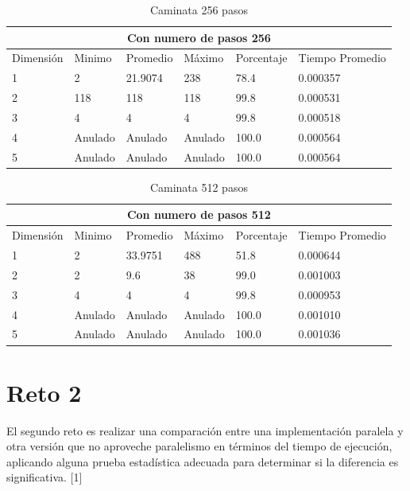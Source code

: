 \documentclass{article}
\begin{document}
\begin{table}[H]
\centering
\begin{tabular}{ |p{2cm}||p{2cm}|p{2cm}|p{2cm}|p{2cm  }|p{2cm}|}
 \hline
 \multicolumn{6}{|c|}{Con numero de pasos 256} \\
 \hline
 Dimensión&Minimo&Promedio&Máximo&Porcentaje&Tiempo Promedio\\
 \hline
 1   & 2       & 21.9074  & 238       & 78.4   & 0.000357\\
 2   & 118     & 118      & 118       & 99.8   & 0.000531\\
 3   & 4       & 4        & 4         & 99.8   & 0.000518\\
 4   & Anulado & Anulado  & Anulado   & 100.0  & 0.000564\\
 5   & Anulado & Anulado  & Anulado   & 100.0  & 0.000564\\
 \hline
\end{tabular}
\caption{Caminata 256 pasos}
\label{table:11}
\end{table}

\begin{table}[H]
\centering
\begin{tabular}{ |p{2cm}||p{2cm}|p{2cm}|p{2cm}|p{2cm  }|p{2cm}|}
 \hline
 \multicolumn{6}{|c|}{Con numero de pasos 512} \\
 \hline
 Dimensión&Minimo&Promedio&Máximo&Porcentaje&Tiempo Promedio\\
 \hline
 1   & 2       & 33.9751  & 488       & 51.8   & 0.000644\\
 2   & 2       & 9.6      & 38        & 99.0   & 0.001003\\
 3   & 4       & 4        & 4         & 99.8   & 0.000953\\
 4   & Anulado & Anulado  & Anulado   & 100.0  & 0.001010\\
 5   & Anulado & Anulado  & Anulado   & 100.0  & 0.001036\\
 \hline
\end{tabular}
\caption{Caminata 512 pasos}
\label{table:12}
\end{table}



\section{Reto 2}
El segundo reto es realizar una comparación entre una implementación paralela y otra versión que no aproveche paralelismo en términos del tiempo de ejecución, aplicando alguna prueba estadística adecuada para determinar si la diferencia es significativa. [1]
\end{document}
